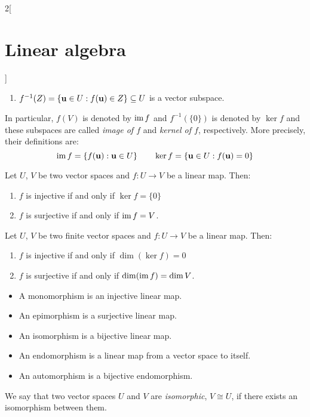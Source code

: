 \documentclass[../../../main.tex]{subfiles}
\begin{document}
\begin{multicols}{2}[\section{Linear algebra}]
\begin{prop}
\begin{enumerate}
      \item $f^{-1}(Z)=\{\boldsymbol{\mathrm{u}}\in U: f(\boldsymbol{\mathrm{u}})\in Z\}\subseteq U$ is a vector subspace.
    \end{enumerate}
    In particular, $f(V)$ is denoted by $\operatorname{im} f$ and $f^{-1}(\{0\})$ is denoted by $\ker f$ and these subspaces are called \textit{image of $f$} and \textit{kernel of $f$}, respectively. More precisely, their definitions are:
    $$\operatorname{im} f=\{f(\boldsymbol{\mathrm{u}}): \boldsymbol{\mathrm{u}}\in U\}\qquad\ker f=\{\boldsymbol{\mathrm{u}}\in U: f(\boldsymbol{\mathrm{u}})=0\}$$
  \end{prop}
  \begin{prop}
    Let $U$, $V$ be two vector spaces and $f:U\rightarrow V$ be a linear map. Then:
    \begin{enumerate}
      \item $f$ is injective if and only if $\ker f=\{0\}$
      \item $f$ is surjective if and only if $\operatorname{im} f=V$.
    \end{enumerate}
  \end{prop}
  \begin{corollary}
    Let $U$, $V$ be two finite vector spaces and $f:U\rightarrow V$ be a linear map. Then:
    \begin{enumerate}
      \item $f$ is injective if and only if $\dim(\ker f)=0$
      \item $f$ is surjective if and only if $\dim(\operatorname{im} f)=\dim V$.
    \end{enumerate}
  \end{corollary}
  \begin{definition}
    \hfill
    \begin{itemize}
      \item A monomorphism is an injective linear map.
      \item An epimorphism is a surjective linear map.
      \item An isomorphism is a bijective linear map.
      \item An endomorphism is a linear map from a vector space to itself.
      \item An automorphism is a bijective endomorphism.
    \end{itemize}
  \end{definition}
  \begin{definition}
    We say that two vector spaces $U$ and $V$ are \textit{isomorphic}, $V\cong U$, if there exists an isomorphism between them.

\end{definition}
\end{multicols}
\end{document}
